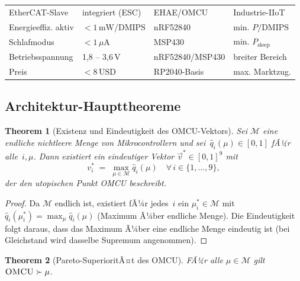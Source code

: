 ﻿\documentclass[12pt, a4paper]{article}
\theoremstyle{plain}
\newtheorem{theorem}{Theorem}[section]
\theoremstyle{definition}
\theoremstyle{remark}
\newcommand{\omcu}{\textsc{OMCU}}
\begin{document}
\begin{table}[H]
\begin{tabular}{llll}
    EtherCAT-Slave         & integriert (ESC)          & EHAE/OMCU        & Industrie-IIoT \\
    Energieeffiz. aktiv & $< 1\,\text{mW/DMIPS}$   & nRF52840         & min. $P/\text{DMIPS}$\\
    Schlafmodus            & $< 1\,\mu\text{A}$        & MSP430           & min. $P_\text{sleep}$\\
    Betriebsspannung       & 1,8 -- 3,6\,V             & nRF52840/MSP430  & breiter Bereich \\
    Preis & $< 8\,\text{USD}$         & RP2040-Basis     & max. Marktzug.\\
    \bottomrule
  \end{tabular}
\end{table}

\subsection{Architektur-Haupttheoreme}

\begin{theorem}[Existenz und Eindeutigkeit des OMCU-Vektors]
\label{thm:omcu_existenz}
  Sei $\mathcal{M}$ eine endliche nichtleere Menge von Mikrocontrollern
  und sei~$\hat{q}_i(\mu) \in [0,1]$ fÃ¼r alle~$i,\mu$.
  Dann existiert ein eindeutiger Vektor
  $\vec{v}^* \in [0,1]^9$ mit
  \[
    v^*_i \;=\; \max_{\mu \in \mathcal{M}} \hat{q}_i(\mu)
    \quad \forall\, i \in \{1,\ldots,9\},
  \]
  der den utopischen Punkt \omcu{} beschreibt.
\end{theorem}

\begin{proof}
  Da $\mathcal{M}$ endlich ist, existiert fÃ¼r jedes~$i$ ein
  $\mu^*_i \in \mathcal{M}$ mit
  $\hat{q}_i(\mu^*_i) = \max_\mu \hat{q}_i(\mu)$
  (Maximum Ã¼ber endliche Menge).
  Die Eindeutigkeit folgt daraus, dass das Maximum Ã¼ber eine endliche Menge
  eindeutig ist (bei Gleichstand wird dasselbe Supremum angenommen).
 
\end{proof}

\begin{theorem}[Pareto-SuperioritÃ¤t des OMCU]
\label{thm:omcu_pareto}
  FÃ¼r alle $\mu \in \mathcal{M}$ gilt $\omcu{} \succ \mu$.
\end{theorem}
\end{document}
